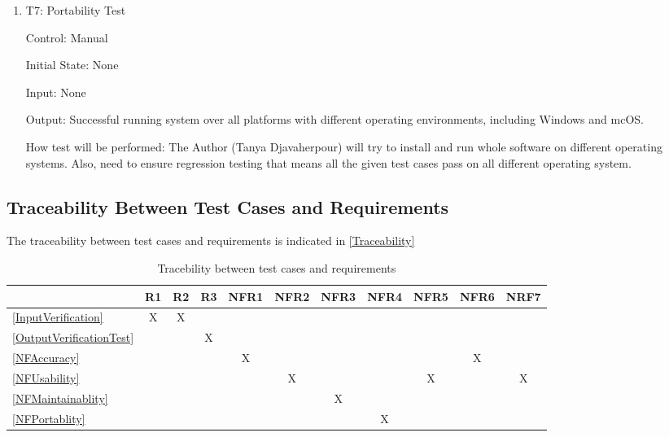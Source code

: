 \documentclass[12pt, titlepage]{article}
\begin{document}
\begin{enumerate}

  \item{T7: Portability Test\\}

  Control: Manual
  
  Initial State: None
  
  Input: None
  
  Output: Successful running system over all platforms with different operating environments, 
  including Windows and mcOS.

  How test will be performed: The Author (Tanya Djavaherpour) will try to install and run
  whole software on different operating systems. Also, need to ensure regression testing
  that means all the given test cases pass on all different operating system.
\end{enumerate}


\subsection{Traceability Between Test Cases and Requirements}

The traceability between test cases and requirements is indicated in \autoref{Traceability} 



\begin{table}[h!]
\begin{center}
\begin{tabular}{ l|c|c|c|c|c|c|c|c|c|c}
\hline
 & R1 & R2 & R3 & NFR1 & NFR2 & NFR3 & NFR4 & NFR5 & NFR6 & NRF7\\
\hline
\ref{InputVerification} & X & X & & & & & & & \\
\hline
\ref{OutputVerificationTest} & & & X & & & & & & \\
\hline
\ref{NFAccuracy} & & & & X & &  & &  & X &\\
\hline
\ref{NFUsability} & & & & & X & & & X & & X\\
\hline
\ref{NFMaintainablity} & & & & & & X & & &\\
\hline
\ref{NFPortablity} & & & & & & & X & & &\\
\hline
\end{tabular}
\caption{Tracebility between test cases and requirements}
\label{Traceability}
\end{center}
\end{table}
\end{document}
